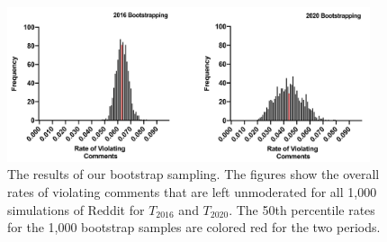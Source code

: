 
\begin{figure}[tb]
  \centering
  \includegraphics[width=0.95\textwidth]{content_minor_revision__Apr2022/images/bootstrap_rate.jpg}
  \caption{The results of our bootstrap sampling. The figures show the overall rates of violating comments that are left unmoderated for all 1,000 simulations of Reddit for $T_{2016}$ and $T_{2020}$. The 50th percentile rates for the 1,000 bootstrap samples are colored red for the two periods.}
  \label{fig:bootstraprate}
\end{figure}
